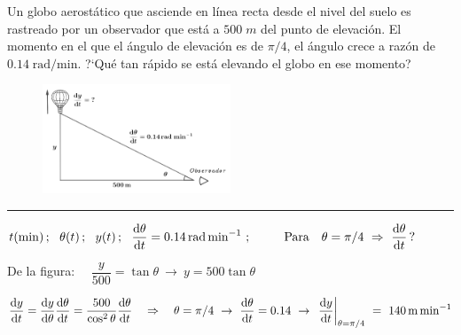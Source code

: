 \vspace{1cm}
\begin{miejercicio}

\begin{multicols}{2}
	
	Un globo aerostático que asciende en línea recta desde el nivel del suelo es rastreado por un observador que está a $500\; m$  del punto de elevación. El momento en el que el ángulo de elevación es de $\pi/4$, el ángulo crece a razón de $0.14\; \mathrm{rad/min}$. ?`Qué tan rápido se está elevando el globo en ese momento? 
	\begin{figure}[H]
	\centering
	\includegraphics[width=0.5\textwidth]{imagenes/T02IM08.png}
	\end{figure}		
	\end{multicols}
\color{teal!80}
\rule{200pt}{0.2pt}
\color{black}
\vspace{5mm}

$t(\mathrm{min})\, ; \ \ \theta(t)\,; \ \ y(t)\, ; \ \ \displaystyle \dv{\theta}{t}=0.14 \, \mathrm{rad\, min}^{-1}\ ; \  \qquad \text{ Para } \ \ \theta=\pi/4 \ \Rightarrow \ \displaystyle \dv{\theta}{t}\, ?   $

\vspace{3mm} De la figura: $\quad 	\dfrac y{500}=\tan \theta \ \to \ y=500\tan \theta $

\vspace{3mm} $\displaystyle \dv{y}{t}=\dv{y}{\theta}\dv{\theta}{t}=\dfrac{500}{\cos^2 \theta}\dv{\theta}{t} \quad \Rightarrow \quad \theta=\pi/4 \ \to \ \dv{\theta}{t}=0.14 \ \to \ \eval{\dv{y}{t}}_{\theta=\pi/4} \ = \ 140\, \mathrm{m\, min}^{-1}$

\end{miejercicio}



